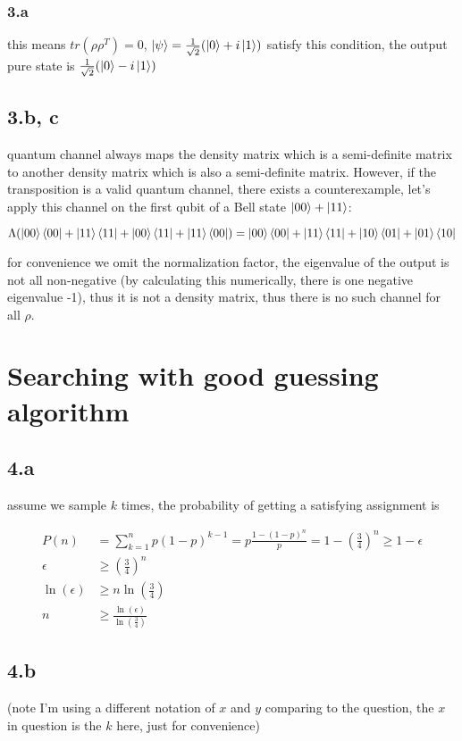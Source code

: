 \documentclass{article}
\begin{document}
\subsubsection*{3.a}
this means $tr(\rho\rho^T) = 0$, $\ket{\psi} = \frac{1}{\sqrt{2}} (\ket{0} + i\ket{1})$ satisfy this condition, the output
pure state is $\frac{1}{\sqrt{2}} (\ket{0} - i\ket{1})$

\subsection*{3.b, c}
quantum channel always maps the density matrix which is a semi-definite matrix to another density matrix which is also a semi-definite
matrix. However, if the transposition is a valid quantum channel, there exists a counterexample, let's apply this channel on the first qubit
of a Bell state $\ket{00} + \ket{11}$:

$$
\Lambda (\ket{00}\bra{00} + \ket{11}\bra{11} + \ket{00}\bra{11} + \ket{11}\bra{00}) = \ket{00}\bra{00} + \ket{11}\bra{11} +
    \ket{10}\bra{01} + \ket{01}\bra{10}
$$

for convenience we omit the normalization factor,
the eigenvalue of the output is not all non-negative (by calculating this numerically,
there is one negative eigenvalue -1), thus it is not a density matrix, thus there is no such channel for all $\rho$.

\section*{Searching with good guessing algorithm}
\subsection*{4.a}
assume we sample $k$ times, the probability of getting a satisfying assignment is

$$
\begin{aligned}
    P(n) &= \sum_{k=1}^n p(1-p)^{k-1} = p \frac{1-(1-p)^n}{p} = 1 - (\frac{3}{4})^n \geq 1-\epsilon\\
    \epsilon &\geq (\frac{3}{4})^n\\
    \ln(\epsilon) &\geq n\ln(\frac{3}{4})\\
    n &\geq \frac{\ln(\epsilon)}{\ln(\frac{3}{4})}
\end{aligned}
$$

\subsection*{4.b}
(note I'm using a different notation of $x$ and $y$ comparing to the question, the $x$ in question is the $k$ here, just for convenience)
\end{document}
